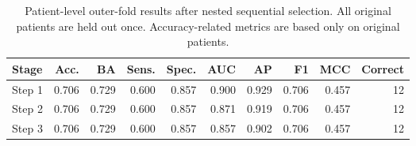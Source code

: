 \begin{table}[t]
\centering
\caption{Patient-level outer-fold results after nested sequential selection. All original patients are held out once. Accuracy-related metrics are based only on original patients.}
\label{tab:nested_stages}
\footnotesize
\setlength{\tabcolsep}{4pt}
\begin{tabular}{lrrrrrrrrr}
\toprule
Stage & Acc. & BA & Sens. & Spec. & AUC & AP & F1 & MCC & Correct \\
\midrule
Step 1 & 0.706 & 0.729 & 0.600 & 0.857 & 0.900 & 0.929 & 0.706 & 0.457 & 12 \\
Step 2 & 0.706 & 0.729 & 0.600 & 0.857 & 0.871 & 0.919 & 0.706 & 0.457 & 12 \\
Step 3 & 0.706 & 0.729 & 0.600 & 0.857 & 0.857 & 0.902 & 0.706 & 0.457 & 12 \\
\bottomrule
\end{tabular}
\end{table}
